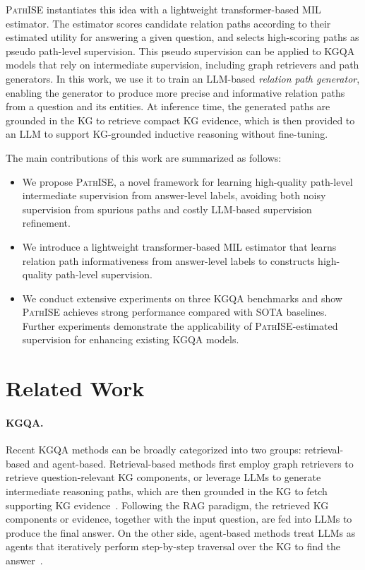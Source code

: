 \documentclass{article}
\newcommand{\framework}{\textsc{PathISE}\xspace}
\begin{document}
\framework instantiates this idea with a lightweight transformer-based MIL estimator. 
The estimator scores candidate relation paths according to their estimated utility for answering a given question, and selects high-scoring paths as pseudo path-level supervision. This pseudo supervision can be applied to KGQA models that rely on intermediate supervision, including graph retrievers and path generators. In this work, we use it to train an LLM-based \emph{relation path generator}, enabling the generator to produce more precise and informative relation paths from a question and its entities. At inference time, the generated paths are grounded in the KG to retrieve compact KG evidence, which is then provided to an LLM to support KG-grounded inductive reasoning without fine-tuning.


The main contributions of this work are summarized as follows:
\begin{itemize}
    \item We propose \framework, a novel framework for learning high-quality path-level intermediate supervision from answer-level labels, avoiding both noisy supervision from spurious paths and costly LLM-based supervision refinement.

    \item We introduce a lightweight transformer-based MIL estimator that learns relation path informativeness from answer-level labels to constructs high-quality path-level supervision.

    \item We conduct extensive experiments on three KGQA benchmarks and show \framework achieves strong performance compared with SOTA baselines. Further experiments demonstrate the applicability of \framework{}-estimated supervision for enhancing existing KGQA models.

\end{itemize}

\vspace{-2mm}
\section{Related Work}\label{sec:related_work}
\vspace{-0.5mm}

\paragraph{KGQA.} Recent KGQA methods can be broadly categorized into two groups: retrieval-based and agent-based. Retrieval-based methods first employ graph retrievers to retrieve question-relevant KG components, or leverage LLMs to generate intermediate reasoning paths, which are then grounded in the KG to fetch supporting KG evidence~\citep{li_subgraphrag_2025, mavromatis_gnnrag_2025, luo_rog_2024, luo_gcr_2025, ma_dp_2025}. Following the RAG paradigm, the retrieved KG components or evidence, together with the input question, are fed into LLMs to produce the final answer. On the other side, agent-based methods treat LLMs as agents that iteratively perform step-by-step traversal over the KG to find the answer~\citep{luo_kbqao1_2025, wang_damr_2025, sun_tog_2024, chen_pog_2024}.
\end{document}
